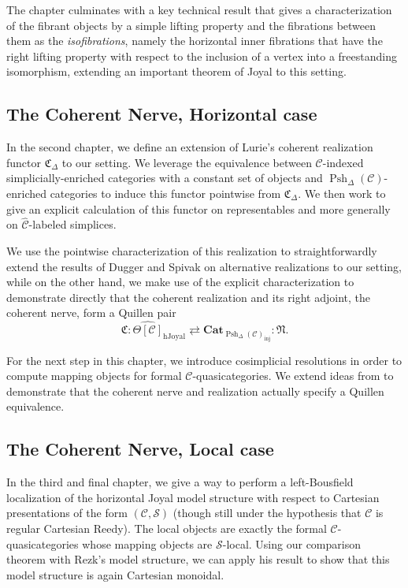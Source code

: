 \documentclass[a4paper]{article}
\numberwithin{equation}{subsection}
\theoremstyle{plain}   %
\theoremstyle{definition}
\theoremstyle{remark}
\theoremstyle{plain}
\newcommand{\Cat}{\ensuremath{\mathbf{Cat}}}
\newcommand{\psh}[1]{\ensuremath{\widehat{#1}}}
\providecommand{\C}{}
\renewcommand{\C}{\ensuremath{\mathcal{C}}}
\newcommand{\setS}{\ensuremath{\mathscr{S}}}
\newcommand{\cellset}{\ensuremath{\widehat{\Theta[\mathcal{C}]}}}
\newcommand{\spsh}{\ensuremath{\operatorname{Psh}_\Delta(\mathcal{C})}}
\begin{document}
The chapter culminates with a key technical result that gives a characterization of the fibrant objects by a simple lifting property and the fibrations between them as the \emph{isofibrations}, namely the horizontal inner fibrations that have the right lifting property with respect to the inclusion of a vertex into a freestanding isomorphism, extending an important  theorem of Joyal to this setting.

\subsection*{The Coherent Nerve, Horizontal case}
In the second chapter, we define an extension of Lurie's coherent realization functor \(\mathfrak{C}_\Delta\) to our setting.  We leverage the equivalence between \(\C\)-indexed simplicially-enriched categories with a constant set of objects and \(\spsh\)-enriched categories to induce this functor pointwise from \(\mathfrak{C}_\Delta\).  We then work to give an explicit calculation of this functor on representables and more generally on \(\psh{\C}\)-labeled simplices.  

We use the pointwise characterization of this realization to straightforwardly extend the results of Dugger and Spivak \cite{ds1} on alternative realizations to our setting, while on the other hand, we make use of the explicit characterization to demonstrate directly that the coherent realization and its right adjoint, the coherent nerve, form a Quillen pair
\[
	\mathfrak{C}:\cellset_{\mathrm{hJoyal}} \rightleftarrows \Cat_{\spsh_{\mathrm{inj}}}:\mathfrak{N}.
\]

For the next step in this chapter, we introduce cosimplicial resolutions in order to compute mapping objects for formal \(\C\)-quasicategories.  We extend ideas from \cite{ds2} to demonstrate that the coherent nerve and realization actually specify a Quillen equivalence.

\subsection*{The Coherent Nerve, Local case}
In the third and final chapter, we give a way to perform a left-Bousfield localization of the horizontal Joyal model structure with respect to Cartesian presentations of the form \((\C,\setS)\) (though still under the hypothesis that \(\C\) is regular Cartesian Reedy).  The local objects are exactly the formal \(\C\)-quasicategories whose mapping objects are \(\setS\)-local.  Using our comparison theorem with Rezk's model structure, we can apply his result to show that this model structure is again Cartesian monoidal.  
\end{document}
